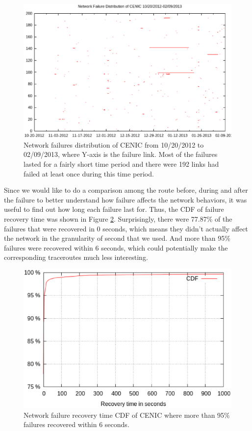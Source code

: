 \documentclass[conference, twocolumn, oneside, 10pt]{IEEEtran}
\begin{document}
\begin{figure}[h!]
\centering
\includegraphics[scale=0.4]{plot/failure_plot.eps}
\caption{Network failures distribution of CENIC from 10/20/2012 to 02/09/2013, where Y-axis is the failure link. Most of the failures lasted for a fairly short time period and there were 192 links had failed at least once during this time period.}
\label{fig:failureplot}
\end{figure}

Since we would like to do a comparison among the route before, during and after the failure to better understand how failure affects the network behaviors, it was useful to find out how long each failure last for. Thus, the CDF of failure recovery time was shown in Figure \ref{fig:failuretime}. Surprisingly, there were 77.87\% of the failures that were recovered in 0 seconds, which means they didn't actually affect the network in the granularity of second that we used. And more than 95\% failures were recovered within 6 seconds, which could potentially make the corresponding traceroutes much less interesting. 

\begin{figure}[h!]
\centering
\includegraphics[scale=0.4]{plot/failure_time.eps}
\caption{Network failure recovery time CDF of CENIC where more than 95\% failures recovered within 6 seconds.}
\label{fig:failuretime}
\end{figure}
\end{document}
